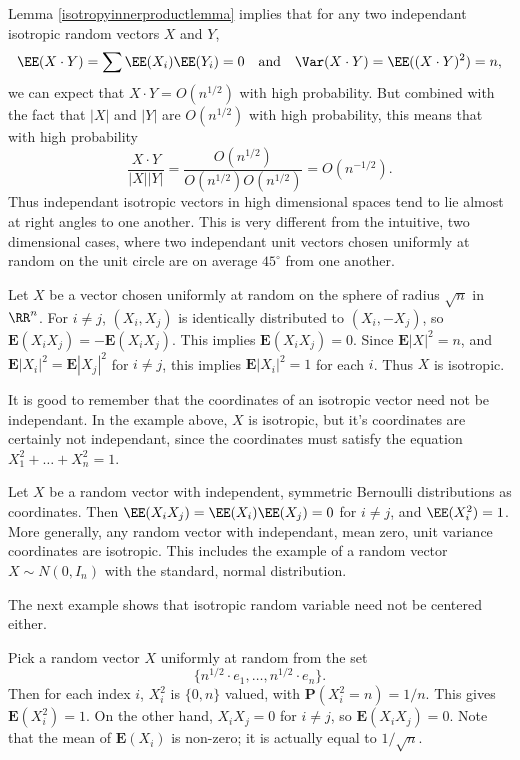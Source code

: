 \begin{remark}
	Lemma \ref{isotropyinnerproductlemma} implies that for any two independant isotropic random vectors $X$ and $Y$,
    \[ \EE(X \cdot Y) = \sum \EE(X_i) \EE(Y_i) = 0\quad\text{and}\quad \Var(X \cdot Y) = \EE((X \cdot Y)^2) = n, \]
    we can expect that $X \cdot Y = O(n^{1/2})$ with high probability. But combined with the fact that $|X|$ and $|Y|$ are $O(n^{1/2})$ with high probability, this means that with high probability
    \[ \frac{X \cdot Y}{|X| |Y|} = \frac{O(n^{1/2})}{O(n^{1/2}) O(n^{1/2})} = O(n^{-1/2}). \]
    Thus independant isotropic vectors in high dimensional spaces tend to lie almost at right angles to one another. This is very different from the intuitive, two dimensional cases, where two independant unit vectors chosen uniformly at random on the unit circle are on average $45^\circ$ from one another.
\end{remark}

\begin{example}
    Let $X$ be a vector chosen uniformly at random on the sphere of radius $\sqrt{n}$ in $\RR^n$. For $i \neq j$, $(X_i,X_j)$ is identically distributed to $(X_i,-X_j)$, so $\mathbf{E}(X_iX_j) = - \mathbf{E}(X_iX_j)$. This implies $\mathbf{E}(X_iX_j) = 0$. Since $\mathbf{E} |X|^2 = n$, and $\mathbf{E} |X_i|^2 = \mathbf{E} |X_j|^2$ for $i \neq j$, this implies $\mathbf{E} |X_i|^2 = 1$ for each $i$. Thus $X$ is isotropic.
\end{example}

It is good to remember that the coordinates of an isotropic vector need not be independant. In the example above, $X$ is isotropic, but it's coordinates are certainly not independant, since the coordinates must satisfy the equation $X_1^2 + \dots + X_n^2 = 1$.

\begin{example}
    Let $X$ be a random vector with independent, symmetric Bernoulli distributions as coordinates. Then $\EE(X_iX_j) = \EE(X_i) \EE(X_j) = 0$ for $i \neq j$, and $\EE(X_i^2) = 1$. More generally, any random vector with independant, mean zero, unit variance coordinates are isotropic. This includes the example of a random vector $X \sim N(0,I_n)$ with the standard, normal distribution.
\end{example}

The next example shows that isotropic random variable need not be centered either.

\begin{example}
    Pick a random vector $X$ uniformly at random from the set
    \[ \{ n^{1/2} \cdot e_1, \dots, n^{1/2} \cdot e_n \}. \]
    Then for each index $i$, $X_i^2$ is $\{ 0,n \}$ valued, with $\mathbf{P}(X_i^2 = n) = 1/n$. This gives $\mathbf{E}(X_i^2) = 1$. On the other hand, $X_iX_j = 0$ for $i \neq j$, so $\mathbf{E}(X_iX_j) = 0$. Note that the mean of $\mathbf{E}(X_i)$ is non-zero; it is actually equal to $1/\sqrt{n}$.
\end{example}

